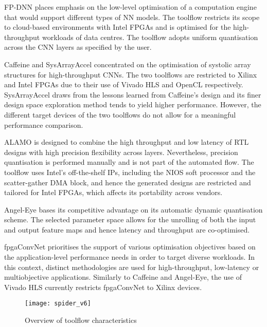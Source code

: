 \documentclass[format=acmsmall, review=false, screen=true]{acmart}
\begin{document}
FP-DNN places emphasis on the low-level optimisation of a computation engine that would support different types of NN models. The toolflow restricts its scope to cloud-based environments with Intel FPGAs and is optimised for the high-throughput workloads of data centres. The toolflow adopts uniform quantisation across the CNN layers as specified by the user.

Caffeine and SysArrayAccel concentrated on the optimisation of systolic array structures for high-throughput CNNs. The two toolflows are restricted to Xilinx and Intel FPGAs due to their use of Vivado HLS and OpenCL respectively. SysArrayAccel draws from the lessons learned from Caffeine's design and its finer design space exploration method tends to yield higher performance. However, the different target devices of the two toolflows do not allow for a meaningful performance comparison.

ALAMO is designed to combine the high throughput and low latency of RTL designs with high precision flexibility across layers. Nevertheless, precision quantisation is performed manually and is not part of the automated flow. The toolflow uses Intel's off-the-shelf IPs, including the NIOS soft processor and the scatter-gather DMA block, and hence the generated designs are restricted and tailored for Intel FPGAs, which affects its portability across vendors.

Angel-Eye bases its competitive advantage on its automatic dynamic quantisation scheme. The selected parameter space allows for the unrolling of both the input and output feature maps and hence latency and throughput are co-optimised.

fpgaConvNet prioritises the support of various optimisation objectives based on the application-level performance needs in order to target diverse workloads. In this context, distinct methodologies are used for high-throughput, low-latency or multiobjective applications. Similarly to Caffeine and Angel-Eye, the use of Vivado HLS currently restricts fpgaConvNet to Xilinx devices. 

 
 \begin{figure}[t] %
    \vspace{-0.5cm}
	\centering
	\texttt{[image: spider\_v6]}
	\caption{Overview of toolflow characteristics}
	\label{fig:spider}
	\vspace{-0.5cm}
\end{figure}
\end{document}
